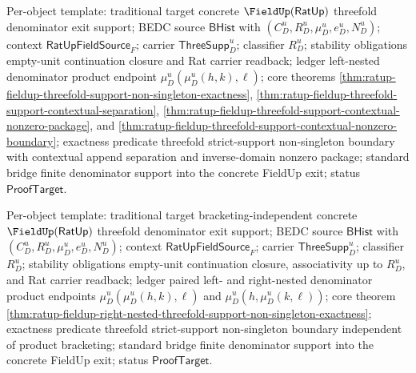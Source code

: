 Per-object template: traditional target concrete $\FieldUp(\mathsf{RatUp})$
threefold denominator exit support; BEDC source $\mathsf{BHist}$ with
$(C_D^u,R_D^u,\mu_D^u,e_D^u,N_D^u)$; context
$\mathsf{RatUpFieldSource}_F$; carrier $\mathsf{ThreeSupp}_D^u$; classifier
$R_D^u$; stability obligations empty-unit continuation closure and Rat
carrier readback; ledger left-nested denominator product endpoint
$\mu_D^u(\mu_D^u(h,k),\ell)$; core theorems
\autoref{thm:ratup-fieldup-threefold-support-non-singleton-exactness},
\autoref{thm:ratup-fieldup-threefold-support-contextual-separation},
\autoref{thm:ratup-fieldup-threefold-support-contextual-nonzero-package}, and
\autoref{thm:ratup-fieldup-threefold-support-contextual-nonzero-boundary};
exactness predicate threefold strict-support non-singleton boundary with contextual
append separation and inverse-domain nonzero package; standard bridge finite
denominator support into the concrete FieldUp exit; status $\mathsf{ProofTarget}$.

Per-object template: traditional target bracketing-independent concrete
$\FieldUp(\mathsf{RatUp})$ threefold denominator exit support; BEDC source
$\mathsf{BHist}$ with $(C_D^u,R_D^u,\mu_D^u,e_D^u,N_D^u)$; context
$\mathsf{RatUpFieldSource}_F$; carrier $\mathsf{ThreeSupp}_D^u$; classifier
$R_D^u$; stability obligations empty-unit continuation closure, associativity
up to $R_D^u$, and Rat carrier readback; ledger paired left- and right-nested
denominator product endpoints $\mu_D^u(\mu_D^u(h,k),\ell)$ and
$\mu_D^u(h,\mu_D^u(k,\ell))$; core theorem
\autoref{thm:ratup-fieldup-right-nested-threefold-support-non-singleton-exactness};
exactness predicate threefold strict-support non-singleton boundary independent
of product bracketing; standard bridge finite denominator support into the
concrete FieldUp exit; status $\mathsf{ProofTarget}$.
